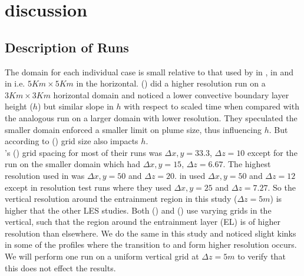 
\chapter{discussion}
\label{ch:results}
\setlength{\parindent}{0cm}

\section{Description of Runs}
\FloatBarrier

The domain for each individual case is small relative to that used by \citeauthor{SullMoengStev} in \cite{SullMoengStev}, \citeauthor{FedConzMir04} in \cite{FedConzMir04} and \citeauthor{BrooksFowler2} in \cite{BrooksFowler2} i.e. $5Km \times 5 Km$ in the horizontal.  \citeauthor{SullMoengStev} (\cite{SullMoengStev}) did a higher resolution run on a $3 Km \times 3 Km$ horizontal domain and noticed a lower convective boundary layer height ($h$) but similar slope in $h$ with respect to scaled time when compared with the analogous run on a larger domain with lower resolution.  They speculated the smaller domain enforced a smaller limit on plume size, thus influencing $h$. But according to \citeauthor{SullPat} (\cite{SullPat}) grid size also impacts $h$. \\

\citeauthor{SullMoengStev}'s (\cite{SullMoengStev}) grid spacing for most of their runs was $\Delta x, y= 33.3$, $\Delta z=10$ except for the run on the smaller domain which had $\Delta x, y = 15$, $\Delta z=6.67$.  The highest resolution \citeauthor{FedConzMir04} used in \cite{FedConzMir04} was $\Delta x, y = 50$ and $\Delta z = 20$.  \citeauthor{BrooksFowler2} in \cite{BrooksFowler2} used $\Delta x, y = 50$ and $\Delta z = 12$ except in resolution test runs where they used $\Delta x, y = 25$ and $\Delta z = 7.27$.  So the vertical resolution around the entrainment region in this study ($\Delta z= 5m$) is higher that the other LES studies. Both \citeauthor{SullMoengStev} (\cite{SullMoengStev}) and \citeauthor{BrooksFowler2} (\cite{BrooksFowler2}) use varying grids in the vertical, such that the region around the entrainment layer (\acs{EL}) is of higher resolution than elsewhere. We do the same in this study and noticed slight kinks in some of the profiles where the transition to and form higher resolution occurs. We will perform one run on a uniform vertical grid at $\Delta z=5m$ to verify that this does not effect the results.\\          

